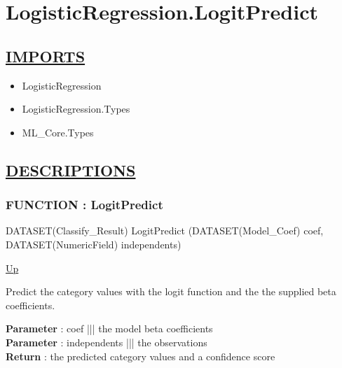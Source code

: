 \chapter*{LogisticRegression.LogitPredict}
\hypertarget{ecldoc:toc:LogisticRegression.LogitPredict}{}

\section*{\underline{IMPORTS}}
\begin{itemize}
\item LogisticRegression
\item LogisticRegression.Types
\item ML\_Core.Types
\end{itemize}

\section*{\underline{DESCRIPTIONS}}
\subsection*{FUNCTION : LogitPredict}
\hypertarget{ecldoc:logisticregression.logitpredict}{}
\begin{minipage}[t]{\textwidth}
\begin{flushleft}
DATASET(Classify\_Result) LogitPredict (DATASET(Model\_Coef) coef, DATASET(NumericField) independents)
\end{flushleft}
\end{minipage}
\hyperlink{ecldoc:toc:LogisticRegression}{Up}

\par
Predict the category values with the logit function and the the supplied beta coefficients.
\par
\textbf{Parameter} : coef ||| the model beta coefficients \\
\textbf{Parameter} : independents ||| the observations \\
\textbf{Return} : the predicted category values and a confidence score \\

